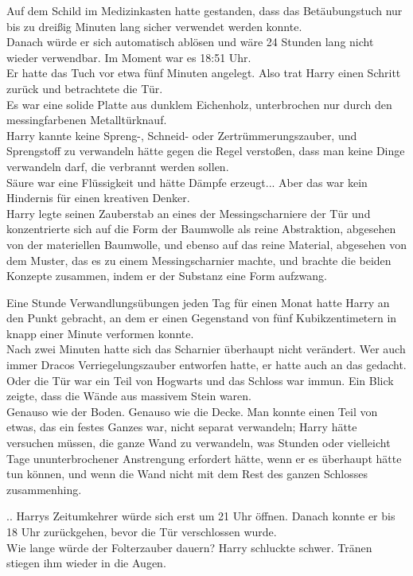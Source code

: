 {Auf dem Schild im Medizinkasten hatte gestanden, dass das Betäubungstuch nur bis zu dreißig Minuten lang sicher verwendet werden konnte.\\ Danach würde er sich automatisch ablösen und wäre 24 Stunden lang nicht wieder verwendbar. Im Moment war es 18:51 Uhr.\\ Er hatte das Tuch vor etwa fünf Minuten angelegt. Also trat Harry einen Schritt zurück und betrachtete die Tür.\\ Es war eine solide Platte aus dunklem Eichenholz, unterbrochen nur durch den messingfarbenen Metalltürknauf.\\ Harry kannte keine Spreng-, Schneid- oder Zertrümmerungszauber, und Sprengstoff zu verwandeln hätte gegen die Regel verstoßen, dass man keine Dinge verwandeln darf, die verbrannt werden sollen.\\ Säure war eine Flüssigkeit und hätte Dämpfe erzeugt... Aber das war kein Hindernis für einen kreativen Denker.\\ Harry legte seinen Zauberstab an eines der Messingscharniere der Tür und konzentrierte sich auf die Form der Baumwolle als reine Abstraktion, abgesehen von der materiellen Baumwolle, und ebenso auf das reine Material, abgesehen von dem Muster, das es zu einem Messingscharnier machte, und brachte die beiden Konzepte zusammen, indem er der Substanz eine Form aufzwang.

Eine Stunde Verwandlungsübungen jeden Tag für einen Monat hatte Harry an den Punkt gebracht, an dem er einen Gegenstand von fünf Kubikzentimetern in knapp einer Minute verformen konnte.\\ Nach zwei Minuten hatte sich das Scharnier überhaupt nicht verändert. Wer auch immer Dracos Verriegelungszauber entworfen hatte, er hatte auch an das gedacht.\\ Oder die Tür war ein Teil von Hogwarts und das Schloss war immun. Ein Blick zeigte, dass die Wände aus massivem Stein waren.\\ Genauso wie der Boden. Genauso wie die Decke. Man konnte einen Teil von etwas, das ein festes Ganzes war, nicht separat verwandeln; Harry hätte versuchen müssen, die ganze Wand zu verwandeln, was Stunden oder vielleicht Tage ununterbrochener Anstrengung erfordert hätte, wenn er es überhaupt hätte tun können, und wenn die Wand nicht mit dem Rest des ganzen Schlosses zusammenhing.

.. Harrys Zeitumkehrer würde sich erst um 21 Uhr öffnen. Danach konnte er bis 18 Uhr zurückgehen, bevor die Tür verschlossen wurde.\\ Wie lange würde der Folterzauber dauern? Harry schluckte schwer. Tränen stiegen ihm wieder in die Augen.

}
